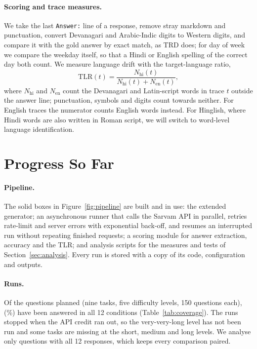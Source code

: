 \documentclass[11pt]{article}
\begin{document}
\paragraph{Scoring and trace measures.}
We take the last \texttt{Answer:} line of a response, remove stray markdown and punctuation, convert Devanagari and Arabic-Indic digits to Western digits, and compare it with the gold answer by exact match, as TRD does; for day of week we compare the weekday itself, so that a Hindi or English spelling of the correct day both count. We measure language drift with the target-language ratio,
\begin{equation}
\mathrm{TLR}(t)=\frac{N_{\mathrm{hi}}(t)}{N_{\mathrm{hi}}(t)+N_{\mathrm{en}}(t)},
\end{equation}
where $N_{\mathrm{hi}}$ and $N_{\mathrm{en}}$ count the Devanagari and Latin-script words in trace $t$ outside the answer line; punctuation, symbols and digits count towards neither. For English traces the numerator counts English words instead. For Hinglish, where Hindi words are also written in Roman script, we will switch to word-level language identification.

\section{Progress So Far}
\label{sec:progress}



\paragraph{Pipeline.}
The solid boxes in Figure~\ref{fig:pipeline} are built and in use: the extended generator; an asynchronous runner that calls the Sarvam API in parallel, retries rate-limit and server errors with exponential back-off, and resumes an interrupted run without repeating finished requests; a scoring module for answer extraction, accuracy and the TLR; and analysis scripts for the measures and tests of Section~\ref{sec:analysis}. Every run is stored with a copy of its code, configuration and outputs.

\paragraph{Runs.}
Of the \NPlannedQuestions{} questions planned (nine tasks, five difficulty levels, 150 questions each), \NQuestions{} (\CoveragePct{}\%) have been answered in all 12 conditions (Table~\ref{tab:coverage}). The runs stopped when the API credit ran out, so the very-very-long level has not been run and some tasks are missing at the short, medium and long levels. We analyse only questions with all 12 responses, which keeps every comparison paired.
\end{document}
